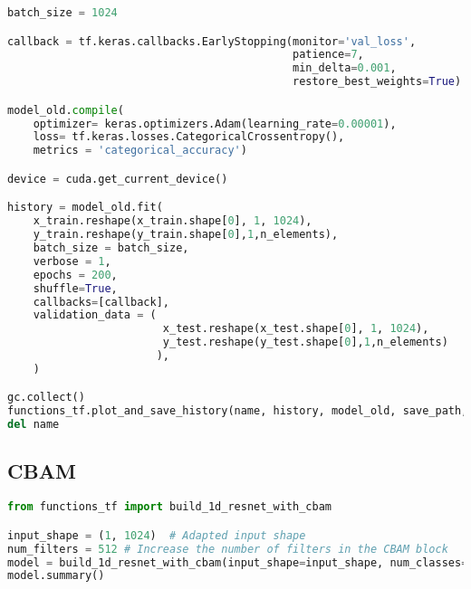 \begin{lstlisting}[language=Python]
batch_size = 1024

callback = tf.keras.callbacks.EarlyStopping(monitor='val_loss', 
                                            patience=7, 
                                            min_delta=0.001,
                                            restore_best_weights=True)

model_old.compile(
    optimizer= keras.optimizers.Adam(learning_rate=0.00001),
    loss= tf.keras.losses.CategoricalCrossentropy(),
    metrics = 'categorical_accuracy')

device = cuda.get_current_device()

history = model_old.fit(
    x_train.reshape(x_train.shape[0], 1, 1024),
    y_train.reshape(y_train.shape[0],1,n_elements),
    batch_size = batch_size,
    verbose = 1,
    epochs = 200,
    shuffle=True,
    callbacks=[callback],
    validation_data = (
                        x_test.reshape(x_test.shape[0], 1, 1024),
                        y_test.reshape(y_test.shape[0],1,n_elements)
                       ),
    )

gc.collect()
functions_tf.plot_and_save_history(name, history, model_old, save_path, subfolder=subfolder)
del name
\end{lstlisting}

\hypertarget{cbam}{%
\subsection{CBAM}\label{cbam}}

\begin{lstlisting}[language=Python]
from functions_tf import build_1d_resnet_with_cbam

input_shape = (1, 1024)  # Adapted input shape
num_filters = 512 # Increase the number of filters in the CBAM block
model = build_1d_resnet_with_cbam(input_shape=input_shape, num_classes=n_elements, num_filters=num_filters, output_shape=(1, 81), res_block_num=2)
model.summary()
\end{lstlisting}

